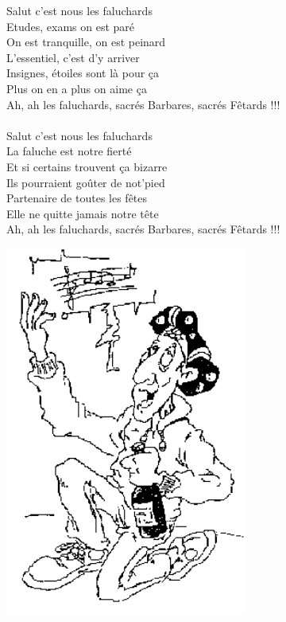 \breakpage
Salut c'est nous les faluchards
\\Etudes, exams on est paré
\\On est tranquille, on est peinard
\\L'essentiel, c'est d'y arriver
\\Insignes, étoiles sont là pour ça
\\Plus on en a plus on aime ça
\\Ah, ah les faluchards, sacrés Barbares, sacrés Fêtards !!!
\\\\Salut c'est nous les faluchards
\\La faluche est notre fierté
\\Et si certains trouvent ça bizarre
\\Ils pourraient goûter de not'pied
\\Partenaire de toutes les fêtes
\\Elle ne quitte jamais notre tête
\\Ah, ah les faluchards, sacrés Barbares, sacrés Fêtards !!!
\\
\bigskip
\begin{center}
\includegraphics[width=0.6\textwidth]{images/Hymne.PNG}
\end{center}

\breakpage